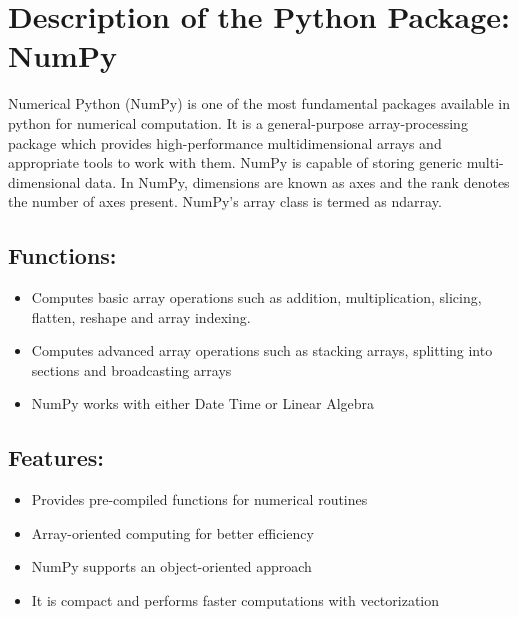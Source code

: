 %
%


\chapter{Description of the Python Package: NumPy}

Numerical Python (NumPy) is one of the most fundamental packages available in python for numerical computation. It is a general-purpose array-processing package which provides high-performance multidimensional arrays and appropriate tools to work with them. NumPy is capable of storing generic multi-dimensional data. In NumPy, dimensions are known as axes and the rank denotes the number of axes present. NumPy's array class is termed as ndarray. 


\section{Functions:}

\begin{itemize}
    \item Computes basic array operations such as addition, multiplication, slicing, flatten, reshape and array indexing.
    \item Computes advanced array operations such as stacking arrays, splitting into sections and broadcasting arrays
    \item NumPy works with either Date Time or Linear Algebra
\end{itemize}



\section{Features:}

\begin{itemize}
    \item Provides pre-compiled functions for numerical routines 
    \item Array-oriented computing for better efficiency
    \item NumPy supports an object-oriented approach
    \item It is compact and performs faster computations with vectorization
\end{itemize}



